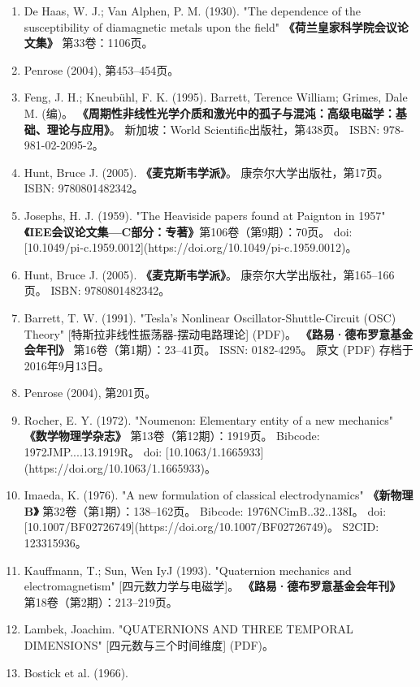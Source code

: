 \begin{enumerate}
\item De Haas, W. J.; Van Alphen, P. M. (1930). 
  "The dependence of the susceptibility of diamagnetic metals upon the field"  
  \textbf{《荷兰皇家科学院会议论文集》} 第33卷：1106页。  
\item Penrose (2004), 第453–454页。  
\item Feng, J. H.; Kneubühl, F. K. (1995).  
  Barrett, Terence William; Grimes, Dale M. (编)。  
  \textbf{《周期性非线性光学介质和激光中的孤子与混沌：高级电磁学：基础、理论与应用》}。  
  新加坡：World Scientific出版社，第438页。  
  ISBN: 978-981-02-2095-2。  
\item Hunt, Bruce J. (2005).  
  \textbf{《麦克斯韦学派》}。  
  康奈尔大学出版社，第17页。  
  ISBN: 9780801482342。  
\item Josephs, H. J. (1959).  
  "The Heaviside papers found at Paignton in 1957"  
  \textbf{《IEE会议论文集—C部分：专著》}第106卷（第9期）：70页。  
  doi: [10.1049/pi-c.1959.0012](https://doi.org/10.1049/pi-c.1959.0012)。  
\item Hunt, Bruce J. (2005).  
  \textbf{《麦克斯韦学派》}。  
  康奈尔大学出版社，第165–166页。  
  ISBN: 9780801482342。  
\item Barrett, T. W. (1991).  
  "Tesla's Nonlinear Oscillator-Shuttle-Circuit (OSC) Theory" [特斯拉非线性振荡器-摆动电路理论] (PDF)。  
  \textbf{《路易·德布罗意基金会年刊》} 第16卷（第1期）：23–41页。  
  ISSN: 0182-4295。  
  原文 (PDF) 存档于2016年9月13日。  
\item Penrose (2004), 第201页。 
\item Rocher, E. Y. (1972).  
  "Noumenon: Elementary entity of a new mechanics"  
  \textbf{《数学物理学杂志》} 第13卷（第12期）：1919页。  
  Bibcode: 1972JMP....13.1919R。  
  doi: [10.1063/1.1665933](https://doi.org/10.1063/1.1665933)。  
\item Imaeda, K. (1976).  
  "A new formulation of classical electrodynamics"  
  \textbf{《新物理B》} 第32卷（第1期）：138–162页。  
  Bibcode: 1976NCimB..32..138I。  
  doi: [10.1007/BF02726749](https://doi.org/10.1007/BF02726749)。  
  S2CID: 123315936。  
\item Kauffmann, T.; Sun, Wen IyJ (1993). 
  "Quaternion mechanics and electromagnetism" [四元数力学与电磁学]。  
  \textbf{《路易·德布罗意基金会年刊》} 第18卷（第2期）：213–219页。  
\item Lambek, Joachim.  
  "QUATERNIONS AND THREE TEMPORAL DIMENSIONS" [四元数与三个时间维度] (PDF)。  
\item Bostick et al. (1966). 

\end{enumerate}
